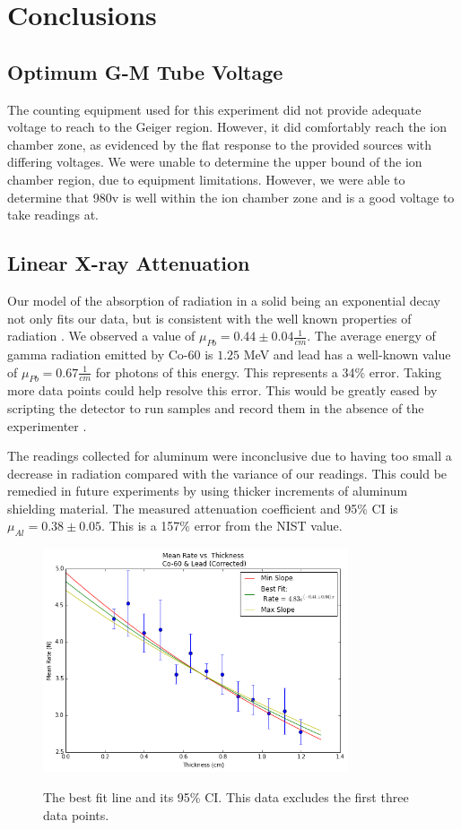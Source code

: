 \documentclass[aps,twocolumn,secnumarabic,balancelastpage,amsmath,amssymb,nofootinbib]{revtex4}
\begin{document}
\section{Conclusions}
\subsection{Optimum G-M Tube Voltage}The counting equipment used for this experiment did not provide adequate voltage to reach to the Geiger region. However, it did comfortably reach the ion chamber zone, as evidenced by the flat response to the provided sources with differing voltages. We were unable to determine the upper bound of the ion chamber region, due to equipment limitations. However, we were able to determine that 980v is well within the ion chamber zone and is a good voltage to take readings at.

\subsection{Linear X-ray Attenuation}
Our model of the absorption of radiation in a solid being an exponential decay not only fits our data, but is consistent with the well known properties of radiation \cite{atten}. We observed a value of $\mu_{Pb} = 0.44 \pm 0.04 \frac{1}{cm}$. The average energy of gamma radiation emitted by Co-60 is $1.25$ MeV and lead has a well-known value of $\mu_{Pb} =  0.67 \frac{1}{cm}$ for photons of this energy.  This represents a 34\% error. Taking more data points could help resolve this error. This would be greatly eased by scripting the detector to run samples and record them in the absence of the experimenter \cite{scriptedExperiment}.

The readings collected for aluminum were inconclusive due to having too small a decrease in radiation compared with the variance of our readings. This could be remedied in future experiments by using thicker increments of aluminum shielding material. The measured attenuation coefficient and 95\% CI is $\mu_{Al} = 0.38 \pm 0.05$. This is a 157\% error from the NIST value.


\begin{figure}[h]
\includegraphics[width=9cm]{conclusionImage}
\label{fig:conclusionImage}
\caption{The best fit line and its 95\% CI. This data excludes the first three data points.}
\end{figure}
\end{document}

